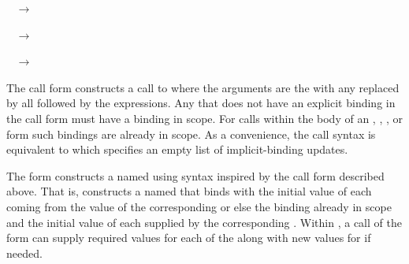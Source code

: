 ~
$\rightarrow$

~
$\rightarrow$

~
$\rightarrow$

The call form
constructs a call to  where the arguments are
the  with any  replaced by 
all followed by the  expressions.
Any  that does not have an explicit
 binding in the call form
must have a binding in scope.
For calls within the body of an
,
,
, or
form such bindings are already in scope.
As a convenience, the call syntax  is equivalent to
 which specifies an empty list of implicit-binding updates.

The  form constructs a named  using
syntax inspired by the call form described above.
That is,
constructs a named  
that binds 
with the initial value of each  coming from
the value of the corresponding 
or else the binding already in scope
and the initial value of each  supplied by
the corresponding .
Within , a call
of the form 
can supply required values for each of the 
along with new values for  \etc{} if needed.
